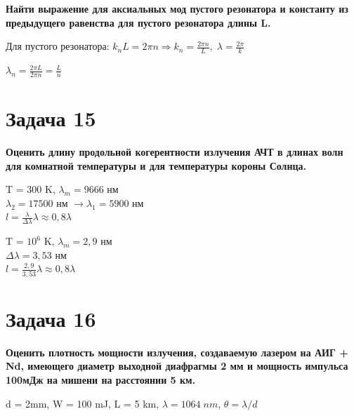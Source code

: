 \documentclass[14pt,a4paper]{article}
\begin{document}
    \par \textbf{Найти выражение для аксиальных мод пустого резонатора и константу из предыдущего равенства для пустого резонатора длины L.}\\
    
    \par 
    Для пустого резонатора: $k_n L = 2 \pi n \Rightarrow k_n = \frac{2 \pi n}{L},\; \lambda = \frac{2 \pi}{k}$

    $\lambda_n = \frac{2 \pi L}{2 \pi n} = \frac{L}{n}$

\section*{Задача 15}
    
    \par \textbf{Оценить длину продольной когерентности излучения АЧТ в
длинах волн для комнатной температуры и для температуры короны Солнца.}\\
    
\par T = 300 K, {$\lambda_m = 9666$} нм\\

{$\lambda_2 = 17500$} нм {$\rightarrow \lambda_1 = 5900$} нм\\

{$l = \frac{\lambda}{\Delta \lambda} \lambda \approx 0,8 \lambda$}\\

\par T = $10^6$ K, {$\lambda_m = 2,9$} нм\\

{$\Delta \lambda = 3,53$} нм\\

{$l = \frac{2,9}{3,53} \lambda \approx 0,8 \lambda$}

\section*{Задача 16}
    
    \par \textbf{Оценить плотность мощности излучения, создаваемую
лазером на АИГ + Nd, имеющего диаметр выходной диафрагмы 2 мм и мощность импульса 100мДж на мишени на расстоянии 5 км.}\\
    
    \par 

    d = 2mm, W = 100 mJ, L = 5 km, $\lambda = 1064\; nm$, $\theta = \lambda / d$
\end{document}
